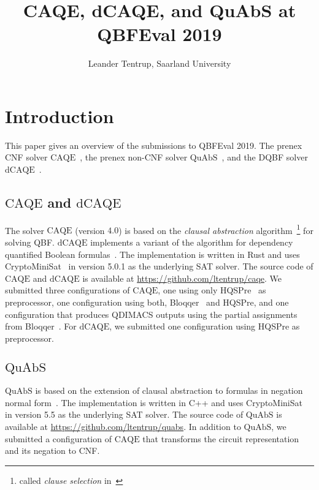 \documentclass[11pt,twocolumn]{article}
\title{CAQE, dCAQE, and QuAbS at QBFEval 2019}
\author{Leander Tentrup, Saarland University}
\date{}
\newcommand{\caqe}{\text{CAQE}}
\newcommand{\dcaqe}{\text{dCAQE}}
\newcommand{\quabs}{\text{QuAbS}}
\begin{document}
\maketitle
  
\section{Introduction}

This paper gives an overview of the submissions to QBFEval 2019.
The prenex CNF solver $\caqe$~\cite{conf/fmcad/RabeT15}, the prenex non-CNF solver $\quabs$~\cite{journals/corr/Tentrup16}, and the DQBF solver $\dcaqe$~\cite{conf/sat/RabeT19}.

\subsection{$\caqe$ and $\dcaqe$}

The solver $\caqe$ (version $4.0$) is based on the \emph{clausal abstraction} algorithm~\cite{conf/fmcad/RabeT15,conf/ijcai/JanotaM15}\footnote{called \emph{clause selection} in~\cite{conf/ijcai/JanotaM15}} for solving QBF.
$\dcaqe$ implements a variant of the algorithm for dependency quantified Boolean formulas~\cite{conf/sat/RabeT19}.
The implementation is written in Rust and uses CryptoMiniSat~\cite{conf/sat/SoosNC09} in version 5.0.1 as the underlying SAT solver.
The source code of $\caqe$ and $\dcaqe$ is available at \url{https://github.com/ltentrup/caqe}.
We submitted three configurations of $\caqe$, one using only HQSPre~\cite{conf/tacas/WimmerRM017} as preprocessor, one configuration using both, Bloqqer~\cite{conf/cade/BiereLS11} and HQSPre, and one configuration that produces QDIMACS outputs using the partial assignments from Bloqqer~\cite{conf/date/SeidlK14}.
For $\dcaqe$, we submitted one configuration using HQSPre as preprocessor.

\subsection{$\quabs$}

$\quabs$ is based on the extension of clausal abstraction to formulas in negation normal form~\cite{journals/corr/Tentrup16,conf/sat/Tentrup16}.
The implementation is written in C++ and uses CryptoMiniSat~\cite{conf/sat/SoosNC09} in version 5.5 as the underlying SAT solver.
The source code of $\quabs$ is available at \url{https://github.com/ltentrup/quabs}.
In addition to $\quabs$, we submitted a configuration of $\caqe$ that transforms the circuit representation and its negation to CNF.
\end{document}
